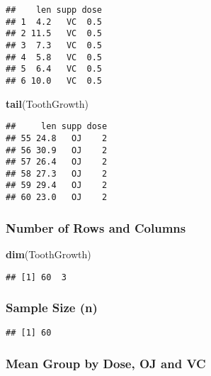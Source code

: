 \documentclass[]{article}
\newenvironment{Shaded}{\begin{snugshade}}{\end{snugshade}}
\newcommand{\KeywordTok}[1]{\textcolor[rgb]{0.13,0.29,0.53}{\textbf{{#1}}}}
\newcommand{\NormalTok}[1]{{#1}}
\begin{document}
\begin{verbatim}
##    len supp dose
## 1  4.2   VC  0.5
## 2 11.5   VC  0.5
## 3  7.3   VC  0.5
## 4  5.8   VC  0.5
## 5  6.4   VC  0.5
## 6 10.0   VC  0.5
\end{verbatim}

\begin{Shaded}
\begin{Highlighting}[]
\KeywordTok{tail}\NormalTok{(ToothGrowth)}
\end{Highlighting}
\end{Shaded}

\begin{verbatim}
##     len supp dose
## 55 24.8   OJ    2
## 56 30.9   OJ    2
## 57 26.4   OJ    2
## 58 27.3   OJ    2
## 59 29.4   OJ    2
## 60 23.0   OJ    2
\end{verbatim}

\subsubsection{Number of Rows and
Columns}\label{number-of-rows-and-columns}

\begin{Shaded}
\begin{Highlighting}[]
\KeywordTok{dim}\NormalTok{(ToothGrowth)}
\end{Highlighting}
\end{Shaded}

\begin{verbatim}
## [1] 60  3
\end{verbatim}

\subsubsection{Sample Size (n)}\label{sample-size-n}

\begin{Shaded}
\end{Shaded}

\begin{verbatim}
## [1] 60
\end{verbatim}

\subsubsection{Mean Group by Dose, OJ and
VC}\label{mean-group-by-dose-oj-and-vc}
\end{document}
